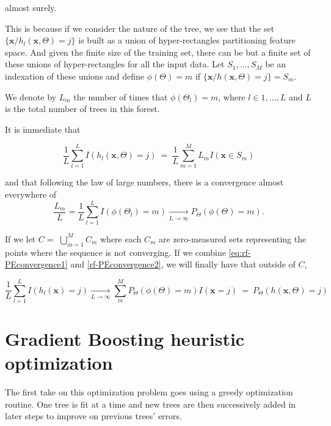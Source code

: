 \begin{appendices}
almost surely.

This is because if we consider the nature of the tree, we see that the set $\{\textbf{x} / h_l(\textbf{x}, \Theta) = j \}$ is built as a union of hyper-rectangles partitioning feature space.
And given the finite size of the training set, there can be but a finite set of these unions of hyper-rectangles for all the input data.
Let $S_1, \ldots, S_M$ be an indexation of these unions and define $\phi(\Theta) = m $ if $\{\textbf{x} / h(\textbf{x}, \Theta) = j \} = S_m$.

We denote by $L_m$ the number of times that $\phi(\Theta_l) =m $, where $l \in {1,\ldots,L}$ and $L$ is the total number of trees in this forest.

It is immediate that

\begin{equation}
\frac{1}{L} \sum_{l=1}^L I(h_l(\textbf{x},\Theta) = j) \ = \ \frac{1}{L} \sum_{m=1}^M L_m I(\textbf{x} \in S_m)
\end{equation}\label{eq:rf-PEconvergence1}

and that following the law of large numbers, there is a convergence almost everywhere of
\begin{equation}\label{rf-PEconvergence2}
\frac{L_m}{L} = \frac{1}{L} \sum_{l=1}^L I(\phi(\Theta_l) = m) \xrightarrow[L \to \infty]{}  P_{\Theta}(\phi(\Theta)= m).
\end{equation}

If we let $C = $ $\bigcup\limits_{m=1}^{M} C_{m}$ where each $C_m$ are zero-measured sets representing the points where the sequence is not converging.
If we combine \cref{eq:rf-PEconvergence1} and \cref{rf-PEconvergence2}, we will finally have that outside of $C$,

\begin{equation}
\frac{1}{L} \sum_{l=1}^L I(h_l(\textbf{x}) = j) \xrightarrow[L \to \infty]{} \sum_m^M  P_{\Theta}(\phi(\Theta)= m) I(\textbf{x} =j ) \ = \ P_{\Theta}(h(\textbf{x}, \Theta) = j)
\end{equation}

\section{Gradient Boosting heuristic optimization}\label{appx:sec:boosting_optimization_heuristic}

The first take on this optimization problem goes using a greedy optimization routine. 
One tree is fit at a time and new trees are then successively added in later steps to improve on previous trees' errors.


\end{appendices}
